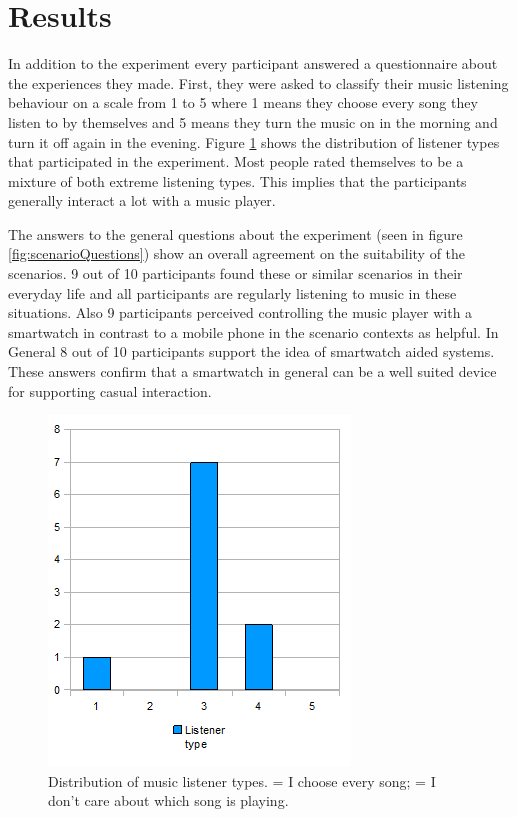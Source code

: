 \section{Results}\label{sec:studyResults}
In addition to the experiment every participant answered a questionnaire about the experiences they made. First, they were asked to classify their music listening behaviour on a scale from 1 to 5 where 1 means they choose every song they listen to by themselves and 5 means they turn the music on in the morning and turn it off again in the evening. Figure \ref{fig:listenerTypes} shows the distribution of listener types that participated in the experiment. Most people rated themselves to be a mixture of both extreme listening types. This implies that the participants generally interact a lot with a music player.

The answers to the general questions about the experiment (seen in figure \ref{fig:scenarioQuestions}) show an overall agreement on the suitability of the scenarios. 9 out of 10 participants found these or similar scenarios in their everyday life and all participants are regularly listening to music in these situations. Also 9 participants perceived controlling the music player with a smartwatch in contrast to a mobile phone in the scenario contexts as helpful. In General 8 out of 10 participants support the idea of smartwatch aided systems. These answers confirm that a smartwatch in general can be a well suited device for supporting casual interaction.

\begin{figure}[h]
	\myfloatalign
	\includegraphics[width=.5\linewidth]{img/listenerTypesPlot.png}
	\caption{Distribution of music listener types.  = I choose every song;  = I don't care about which song is playing.}
	\label{fig:listenerTypes}
\end{figure}

